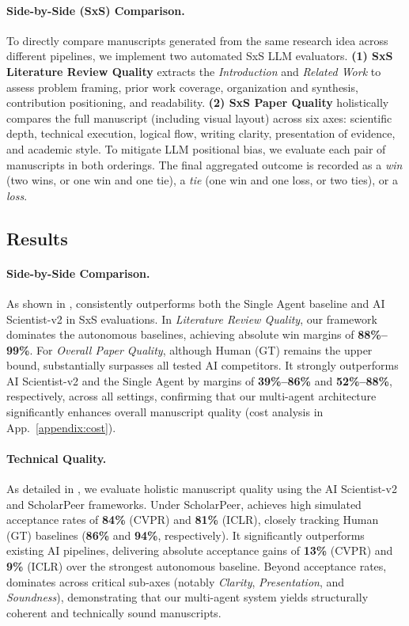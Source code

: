 \paragraph{Side-by-Side (SxS) Comparison.} To directly compare manuscripts generated from the same research idea across different pipelines, we implement two automated SxS LLM evaluators. \textbf{(1) SxS Literature Review Quality} extracts the \textit{Introduction} and \textit{Related Work} to assess problem framing, prior work coverage, organization and synthesis, contribution positioning, and readability. \textbf{(2) SxS Paper Quality} holistically compares the full manuscript (including visual layout) across six axes: scientific depth, technical execution, logical flow, writing clarity, presentation of evidence, and academic style. To mitigate LLM positional bias, we evaluate each pair of manuscripts in both orderings. The final aggregated outcome is recorded as a \textit{win} (two wins, or one win and one tie), a \textit{tie} (one win and one loss, or two ties), or a \textit{loss}.

\subsection{Results}
\paragraph{Side-by-Side Comparison.} As shown in , \ourmethod{} consistently outperforms both the Single Agent baseline and AI Scientist-v2 in SxS evaluations. In \textit{Literature Review Quality}, our framework dominates the autonomous baselines, achieving absolute win margins of \textbf{88\%--99\%}. For \textit{Overall Paper Quality}, although Human (GT) remains the upper bound, \ourmethod{} substantially surpasses all tested AI competitors. It strongly outperforms AI Scientist-v2 and the Single Agent by margins of \textbf{39\%--86\%} and \textbf{52\%--88\%}, respectively, across all settings, confirming that our multi-agent architecture significantly enhances overall manuscript quality (cost analysis in App.~\ref{appendix:cost}).

\paragraph{Technical Quality.} As detailed in , we evaluate holistic manuscript quality using the AI Scientist-v2 and ScholarPeer frameworks. Under ScholarPeer, \ourmethod{} achieves high simulated acceptance rates of \textbf{84\%} (CVPR) and \textbf{81\%} (ICLR), closely tracking Human (GT) baselines (\textbf{86\%} and \textbf{94\%}, respectively). It significantly outperforms existing AI pipelines, delivering absolute acceptance gains of \textbf{13\%} (CVPR) and \textbf{9\%} (ICLR) over the strongest autonomous baseline. Beyond acceptance rates, \ourmethod{} dominates across critical sub-axes (notably \textit{Clarity}, \textit{Presentation}, and \textit{Soundness}), demonstrating that our multi-agent system yields structurally coherent and technically sound manuscripts.


